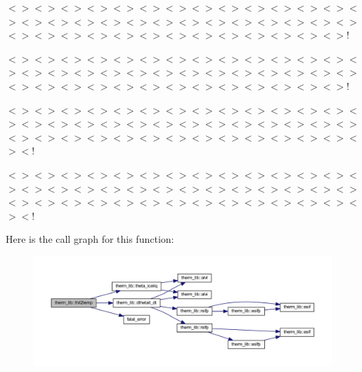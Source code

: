 $<$$>$$<$$>$$<$$>$$<$$>$$<$$>$$<$$>$$<$$>$$<$$>$$<$$>$$<$$>$$<$$>$$<$$>$$<$$>$$<$$>$$<$$>$$<$$>$$<$$>$$<$$>$$<$$>$$<$$>$$<$$>$$<$$>$$<$$>$$<$$>$$<$$>$$<$$>$$<$$>$$<$$>$$<$$>$$<$$>$$<$$>$$<$$>$$<$$>$$<$$>$$<$$>$$<$$>$$<$$>$$<$$>$$<$$>$$<$$>$!

$<$$>$$<$$>$$<$$>$$<$$>$$<$$>$$<$$>$$<$$>$$<$$>$$<$$>$$<$$>$$<$$>$$<$$>$$<$$>$$<$$>$$<$$>$$<$$>$$<$$>$$<$$>$$<$$>$$<$$>$$<$$>$$<$$>$$<$$>$$<$$>$$<$$>$$<$$>$$<$$>$$<$$>$$<$$>$$<$$>$$<$$>$$<$$>$$<$$>$$<$$>$$<$$>$$<$$>$$<$$>$$<$$>$$<$$>$$<$$>$!

$<$$>$$<$$>$$<$$>$$<$$>$$<$$>$$<$$>$$<$$>$$<$$>$$<$$>$$<$$>$$<$$>$$<$$>$$<$$>$$<$$>$$<$$>$$<$$>$$<$$>$$<$$>$$<$$>$$<$$>$$<$$>$$<$$>$$<$$>$$<$$>$$<$$>$$<$$>$$<$$>$$<$$>$$<$$>$$<$$>$$<$$>$$<$$>$$<$$>$$<$$>$$<$$>$$<$$>$$<$$>$$<$$>$$<$$>$$<$$>$$<$$>$$<$!

$<$$>$$<$$>$$<$$>$$<$$>$$<$$>$$<$$>$$<$$>$$<$$>$$<$$>$$<$$>$$<$$>$$<$$>$$<$$>$$<$$>$$<$$>$$<$$>$$<$$>$$<$$>$$<$$>$$<$$>$$<$$>$$<$$>$$<$$>$$<$$>$$<$$>$$<$$>$$<$$>$$<$$>$$<$$>$$<$$>$$<$$>$$<$$>$$<$$>$$<$$>$$<$$>$$<$$>$$<$$>$$<$$>$$<$$>$$<$$>$$<$$>$$<$! 

Here is the call graph for this function\+:\nopagebreak
\begin{figure}[H]
\begin{center}
\leavevmode
\includegraphics[width=350pt]{namespacetherm__lib_ac1f38c4afbbc3cf5a540d4e87c8b22c8_cgraph}
\end{center}
\end{figure}


